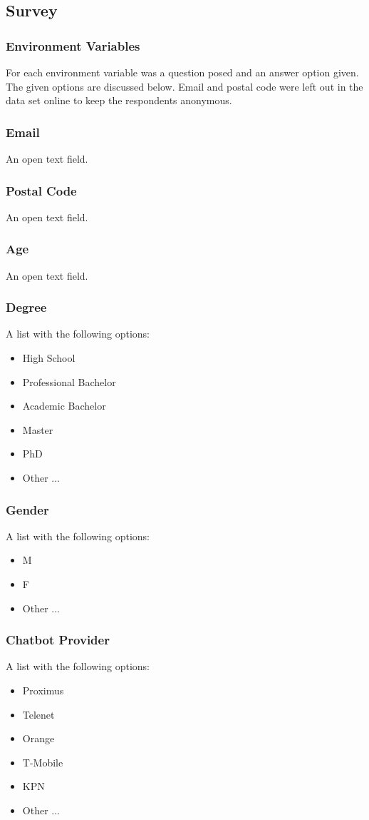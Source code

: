 \begin{appendices}
	\section{Survey}
	\label{ap:survey}
	\subsubsection{Environment Variables}
	For each environment variable was a question posed and an answer option given. The given options are discussed below. Email and postal code were left out in the data set online to keep the respondents anonymous.
	\subsubsection{Email}
	An open text field.
	\subsubsection{Postal Code}
	An open text field.
	\subsubsection{Age}
	An open text field.
	\subsubsection{Degree}
	A list with the following options:
	\begin{itemize}
		\item High School
		\item Professional Bachelor
		\item Academic Bachelor
		\item Master
		\item PhD
		\item Other ...
	\end{itemize}
	\subsubsection{Gender}
	A list with the following options:
	\begin{itemize}
		\item M
		\item F
		\item Other ...
	\end{itemize}
	\subsubsection{Chatbot Provider}
	A list with the following options:
	\begin{itemize}
		\item Proximus
		\item Telenet
		\item Orange
		\item T-Mobile
		\item KPN
		\item Other ...
	\end{itemize}

\end{appendices}
